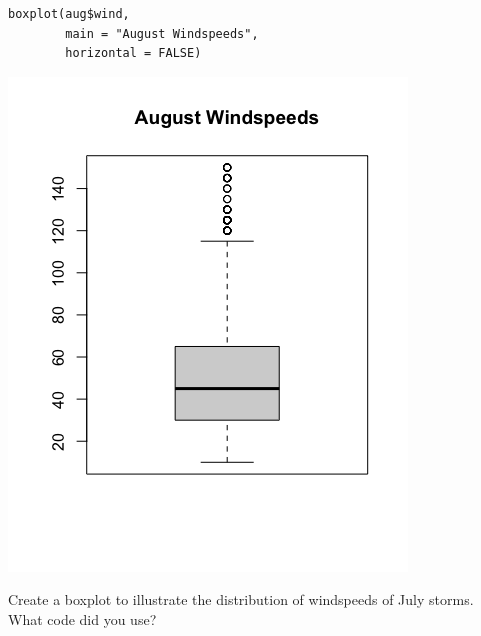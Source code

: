 \begin{multicols}{2}

\begin{lstlisting}
boxplot(aug$wind, 
        main = "August Windspeeds", 
        horizontal = FALSE)
\end{lstlisting}

\columnbreak

\includegraphics[width=0.45\tw]{02/fig-aug-box.png}

\end{multicols}

\clearpage



\bb[resume]
\ii Create a boxplot to illustrate the distribution of windspeeds of July storms. What code did you use?  \vfill


